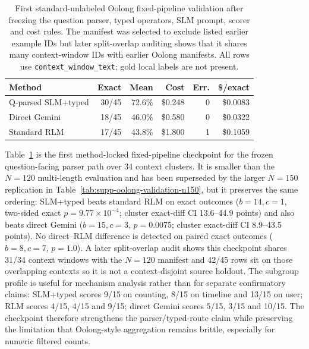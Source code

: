 \documentclass[letterpaper]{article}
\begin{document}
\begin{table}[!t]
\centering
\small
\setlength{\tabcolsep}{3pt}
\begin{tabular}{@{}lrrrrr@{}}
\toprule
\textbf{Method} & \textbf{Exact} & \textbf{Mean} & \textbf{Cost} & \textbf{Err.} & \textbf{\$/exact} \\
\midrule
Q-parsed SLM+typed & 30/45 & 72.6\% & \$0.248 & 0 & \$0.0083 \\
Direct Gemini & 18/45 & 46.0\% & \$0.580 & 0 & \$0.0322 \\
Standard RLM & 17/45 & 43.8\% & \$1.800 & 1 & \$0.1059 \\
\bottomrule
\end{tabular}
\caption{First standard-unlabeled Oolong fixed-pipeline validation after freezing the question parser, typed operators, SLM prompt, scorer and cost rules. The manifest was selected to exclude listed earlier example IDs but later split-overlap auditing shows that it shares many context-window IDs with earlier Oolong manifests. All rows use \texttt{context\_window\_text}; gold local labels are not present.}
\label{tab:supp-oolong-validation-n45}
\end{table}

Table~\ref{tab:supp-oolong-validation-n45} is the first method-locked fixed-pipeline checkpoint for the frozen question-facing parser path over 34 context clusters. It is smaller than the $N=120$ multi-length evaluation and has been superseded by the larger $N=150$ replication in Table~\ref{tab:supp-oolong-validation-n150}, but it preserves the same ordering: SLM+typed beats standard RLM on exact outcomes ($b=14,c=1$, two-sided exact $p=9.77\times10^{-4}$; cluster exact-diff CI 13.6--44.9 points) and also beats direct Gemini ($b=15,c=3$, $p=0.0075$; cluster exact-diff CI 8.9--43.5 points). No direct--RLM difference is detected on paired exact outcomes ($b=8,c=7$, $p=1.0$). A later split-overlap audit shows this checkpoint shares 31/34 context windows with the $N=120$ manifest and 42/45 rows sit on those overlapping contexts so it is not a context-disjoint source holdout. The subgroup profile is useful for mechanism analysis rather than for separate confirmatory claims: SLM+typed scores 9/15 on counting, 8/15 on timeline and 13/15 on user; RLM scores 4/15, 4/15 and 9/15; direct Gemini scores 5/15, 3/15 and 10/15. The checkpoint therefore strengthens the parser/typed-route claim while preserving the limitation that Oolong-style aggregation remains brittle, especially for numeric filtered counts.
\end{document}
